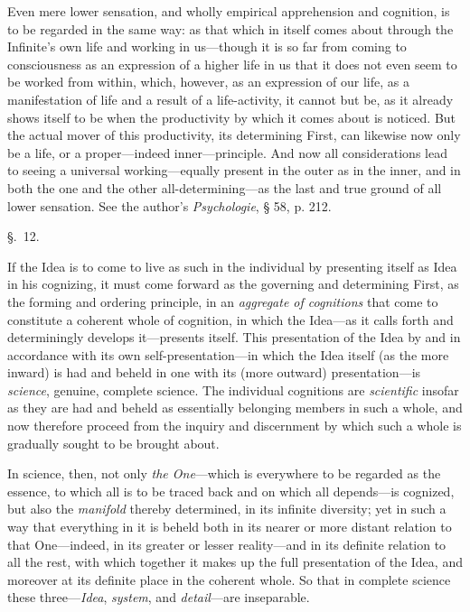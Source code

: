 \documentclass[12pt,a4paper]{book}
\begin{document}
Even mere lower sensation, and wholly empirical apprehension and cognition, is to be
regarded in the same way: as that which in itself comes about through the Infinite's
own life and working in us---though it is so far from coming to consciousness as an
expression of a higher life in us that it does not even seem to be worked from within,
which, however, as an expression of our life, as a manifestation of life and a result
of a life-activity, it cannot but be, as it already shows itself to be when the
productivity by which it comes about is noticed. But the actual mover of this
productivity, its determining First, can likewise now only be a life, or a
proper---indeed inner---principle. And now all considerations lead to seeing a
universal working---equally present in the outer as in the inner, and in both the one
and the other all-determining---as the last and true ground of all lower sensation.
See the author's \textit{Psychologie}, § 58, p. 212.

\begin{center}\large\S.~12.\end{center}
If the Idea is to come to live as such in the individual by presenting itself as
Idea in his cognizing, it must come forward as the governing and determining First,
as the forming and ordering principle, in an \emph{aggregate of cognitions} that come to
constitute a coherent whole of cognition, in which the Idea---as it calls forth and
determiningly develops it---presents itself. This presentation of the Idea by and in
accordance with its own self-presentation---in which the Idea itself (as the more
inward) is had and beheld in one with its (more outward) presentation---is \emph{science},
genuine, complete science. The individual cognitions are \emph{scientific} insofar as
they are had and beheld as essentially belonging members in such a whole, and now
therefore proceed from the inquiry and discernment by which such a whole is gradually
sought to be brought about.

In science, then, not only \emph{the One}---which is everywhere to be regarded as the
essence, to which all is to be traced back and on which all depends---is cognized, but
also the \emph{manifold} thereby determined, in its infinite diversity; yet in such a
way that everything in it is beheld both in its nearer or more distant relation to
that One---indeed, in its greater or lesser reality---and in its definite relation to
all the rest, with which together it makes up the full presentation of the Idea, and
moreover at its definite place in the coherent whole. So that in complete science
these three---\emph{Idea}, \emph{system}, and \emph{detail}---are inseparable.
\end{document}
